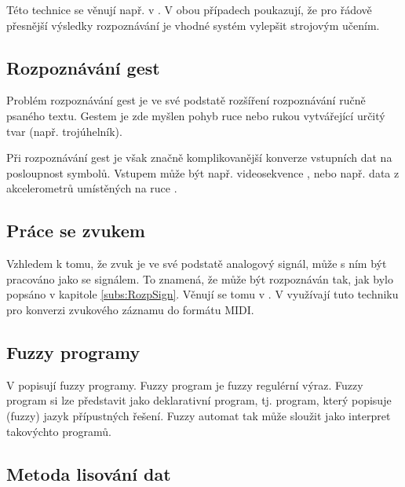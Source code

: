 Této technice se věnují např. v \cite{AstGariGonVillFar-ApprStrMatUsiDefFuzzAutLearExpr, WeeFu-FormFuzAutAppModLeaSys}. V obou případech poukazují, že pro řádově přesnější výsledky rozpoznávání je vhodné systém vylepšit strojovým učením.

\subsection{Rozpoznávání gest} \label{subs:GestRec}
Problém rozpoznávání gest je ve své podstatě rozšíření rozpoznávání ručně psaného textu. Gestem je zde myšlen pohyb ruce nebo rukou vytvářející určitý tvar (např. trojúhelník).

Při rozpoznávání gest je však značně komplikovanější konverze vstupních dat na posloupnost symbolů. Vstupem může být např. videosekvence \cite{Tho-FinFuzzAutRegFuzLangPatRec}, nebo např. data z akcelerometrů umístěných na ruce \cite{BaiTri-PattRecUsiTemFuzzAut}.

\subsection{Práce se zvukem}
Vzhledem k tomu, že zvuk je ve své podstatě analogový signál, může s ním být pracováno jako se signálem. To znamená, že může být rozpoznáván tak, jak bylo popsáno v kapitole \ref{subs:RozpSign}. Věnují se tomu v \cite{ForBel-GenMusAccUsFinStaTra, OliWag-ComMusNeuNetProFiStMa}. V \cite{ForBel-GenMusAccUsFinStaTra} využívají tuto techniku pro konverzi zvukového záznamu do formátu MIDI.

\subsection{Fuzzy programy}
V \cite{Cha-ExeFuzProUsFiStaMa} popisují fuzzy programy. Fuzzy program je fuzzy regulérní výraz. Fuzzy program si lze představit jako deklarativní program, tj. program, který popisuje (fuzzy) jazyk přípustných řešení. Fuzzy automat tak může sloužit jako interpret takovýchto programů. 

\subsection{Metoda lisování dat} \label{subs:DataPresTech}

